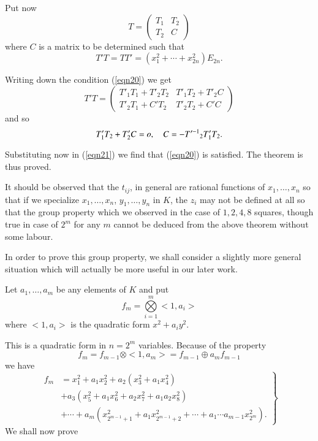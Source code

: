 \begin{Proof}
Put now
$$
T=
\begin{pmatrix}
T_1 & T_2\\
T_2 & C
\end{pmatrix}
$$
where $C$ is a matrix to be determined such that
\begin{equation}\label{eqn20}
T'T=TT'=\left(x^{2}_1+\cdots+x^{2}_{2n}\right)E_{2n}.
\end{equation}

Writing down the condition (\ref{eqn20}) we get
$$
T'T=
\begin{pmatrix}
T'_1T_1+T'_2T_2 & T'_1T_2+T'_2C\\
T'_2T_1+C'T_2 & T'_2T_2+C'C
\end{pmatrix}
$$
and so 
$$
T'_1T_2+T'_2C=o,\quad C=-{T'^{-1}}_2T'_1T_2.
$$

Substituting now in (\ref{eqn21}) we find that (\ref{eqn20}) is
satisfied. The theorem is thus proved.

It should be observed that the $t_{ij}$, in general are rational
functions of $x_1,\ldots,x_n$ so that if we specialize
$x_1,\ldots,x_n$, $y_1,\ldots,y_n$ in $K$, the $z_i$ may not be
defined at all so that the group property which we observed in the
case of $1,2,4,8$ squares, though true in case of $2^{m}$ for any $m$
cannot be deduced from the above theorem without some labour.

In order to prove this group property, we shall consider a slightly
more general situation which will actually be more useful in our later
work.

Let $a_1,\ldots,a_m$ be any elements of $K$ and put 
\begin{equation}\label{eqn21}
f_m=\bigotimes\limits^{m}_{i=1}<1, a_i>
\end{equation}
where $<1,a_i>$ is the quadratic form $x^{2}+a_iy^{2}$.

This is a quadratic form in $n=2^{m}$ variables. Because of the
property
\begin{equation}\label{eqn22}
f_m=f_{m-1}\otimes <1,a_m> = f_{m-1}\oplus a_mf_{m-1}
\end{equation}
we have 
\begin{equation}\label{eqn23}
\left.\begin{aligned}
f_m&=x^{2}_1+a_1x^{2}_2+a_2\left(x^{2}_3+a_1x^{2}_4\right)\\
                 &+a_3\left(x^{2}_5+a_1x^{2}_6+a_2x^{2}_7+a_1a_2x^{2}_8\right)\\
                 &+\cdots+
a_m\left(x^{2}_{2^{m-1}+1}+a_1x^{2}_{2^{m-1}+2}+\cdots+a_1\cdots a_{m-1}x^{2}_{2^{m}}\right).
\end{aligned}\right\}
\end{equation}
We shall now prove
\enprf
\end{Proof}


